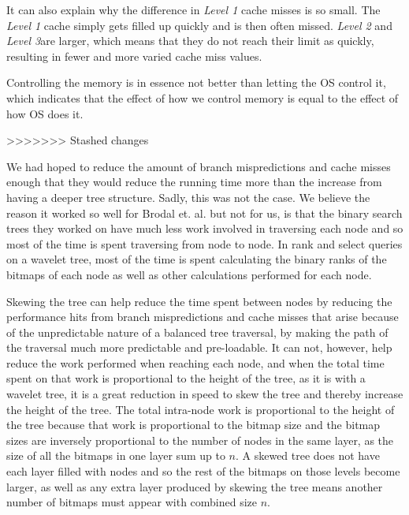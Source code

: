 It can also explain why the difference in \textit{Level 1} cache misses is so small. 
The \textit{Level 1} cache simply gets filled up quickly and is then often missed. \textit{Level 2} and \textit{Level 3}are larger, which means that they do not reach their limit as quickly, resulting in fewer and more varied cache miss values.



Controlling the memory is in essence not better than letting the OS control it, which indicates that the effect of how we control memory is equal to the effect of how OS does it.



>>>>>>> Stashed changes

We had hoped to reduce the amount of branch mispredictions and cache misses enough that they would reduce the running time more than the increase from having a deeper tree structure.
Sadly, this was not the case. We believe the reason it worked so well for Brodal et. al.\cite{gerthSkewedBinarySearchTrees} but not for us, is that the binary search trees they worked on have much less work involved in traversing each node and so most of the time is spent traversing from node to node.
In rank and select queries on a wavelet tree, most of the time is spent calculating the binary ranks of the bitmaps of each node as well as other calculations performed for each node.

Skewing the tree can help reduce the time spent between nodes by reducing the performance hits from branch mispredictions and cache misses that arise because of the unpredictable nature of a balanced tree traversal, by making the path of the traversal much more predictable and pre-loadable.
It can not, however, help reduce the work performed when reaching each node, and when the total time spent on that work is proportional to the height of the tree, as it is with a wavelet tree, it is a great reduction in speed to skew the tree and thereby increase the height of the tree.
The total intra-node work is proportional to the height of the tree because that work is proportional to the bitmap size and the bitmap sizes are inversely proportional to the number of nodes in the same layer, as the size of all the bitmaps in one layer sum up to $n$. A skewed tree does not have each layer filled with nodes and so the rest of the bitmaps on those levels become larger, as well as any extra layer produced by skewing the tree means another number of bitmaps must appear with combined size $n$.


